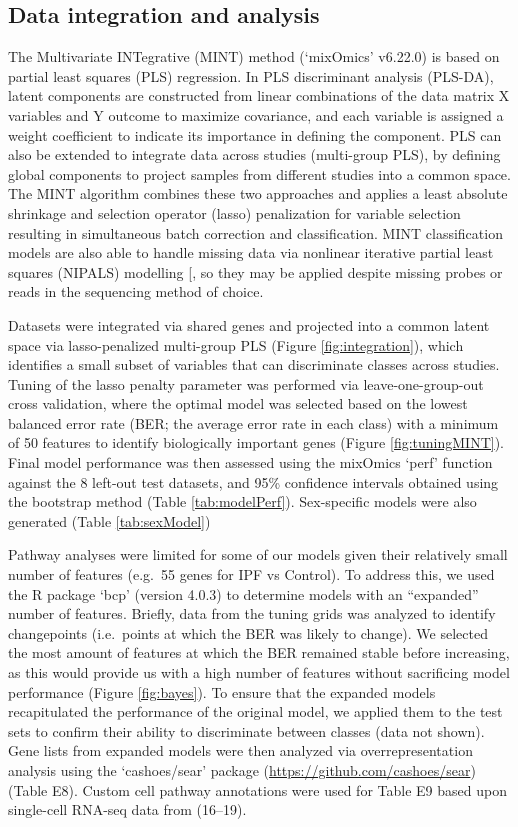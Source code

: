 \documentclass[
]{article}
\begin{document}
\subsection{Data integration and analysis}\label{data}

The Multivariate INTegrative (MINT) method (`mixOmics' v6.22.0) is based on partial least squares (PLS) regression. In PLS discriminant analysis (PLS-DA), latent components are constructed from linear combinations of the data matrix X variables and Y outcome to maximize covariance, and each variable is assigned a weight coefficient to indicate its importance in defining the component. PLS can also be extended to integrate data across studies (multi-group PLS), by defining global components to project samples from different studies into a common space. The MINT algorithm combines these two approaches and applies a least absolute shrinkage and selection operator (lasso) penalization for variable selection resulting in simultaneous batch correction and classification. MINT classification models are also able to handle missing data via nonlinear iterative partial least squares (NIPALS) modelling {[}\citeproc{ref-wold_nonlinear_1973}{130}{]}, so they may be applied despite missing probes or reads in the sequencing method of choice.

Datasets were integrated via shared genes and projected into a common latent space via lasso-penalized multi-group PLS (Figure \ref{fig:integration}), which identifies a small subset of variables that can discriminate classes across studies. Tuning of the lasso penalty parameter was performed via leave-one-group-out cross validation, where the optimal model was selected based on the lowest balanced error rate (BER; the average error rate in each class) with a minimum of 50 features to identify biologically important genes (Figure \ref{fig:tuningMINT}). Final model performance was then assessed using the mixOmics `perf' function against the 8 left-out test datasets, and 95\% confidence intervals obtained using the bootstrap method (Table \ref{tab:modelPerf}). Sex-specific models were also generated (Table \ref{tab:sexModel})

Pathway analyses were limited for some of our models given their relatively small number of features (e.g.~55 genes for IPF vs Control). To address this, we used the R package `bcp' (version 4.0.3) to determine models with an ``expanded'' number of features. Briefly, data from the tuning grids was analyzed to identify changepoints (i.e.~points at which the BER was likely to change). We selected the most amount of features at which the BER remained stable before increasing, as this would provide us with a high number of features without sacrificing model performance (Figure \ref{fig:bayes}). To ensure that the expanded models recapitulated the performance of the original model, we applied them to the test sets to confirm their ability to discriminate between classes (data not shown).
Gene lists from expanded models were then analyzed via overrepresentation analysis using the `cashoes/sear' package (\url{https://github.com/cashoes/sear}) (Table E8).
Custom cell pathway annotations were used for Table E9 based upon single-cell RNA-seq data from (16--19).
\end{document}

